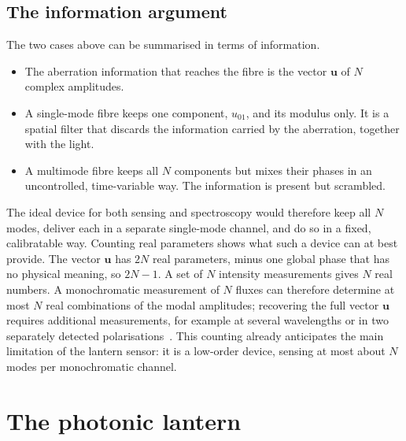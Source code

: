 \documentclass[11pt,a4paper]{article}
\newcommand{\uvec}{\mathbf{u}}
\begin{document}
\subsection{The information argument}
The two cases above can be summarised in terms of information.
\begin{itemize}
\item The aberration information that reaches the fibre is the vector $\uvec$ of $N$ complex amplitudes.
\item A single-mode fibre keeps one component, $u_{01}$, and its modulus only. It is a spatial filter that discards the information carried by the aberration, together with the light.
\item A multimode fibre keeps all $N$ components but mixes their phases in an uncontrolled, time-variable way. The information is present but scrambled.
\end{itemize}
The ideal device for both sensing and spectroscopy would therefore keep all $N$ modes, deliver each in a separate single-mode channel, and do so in a fixed, calibratable way. Counting real parameters shows what such a device can at best provide. The vector $\uvec$ has $2N$ real parameters, minus one global phase that has no physical meaning, so $2N - 1$. A set of $N$ intensity measurements gives $N$ real numbers. A monochromatic measurement of $N$ fluxes can therefore determine at most $N$ real combinations of the modal amplitudes; recovering the full vector $\uvec$ requires additional measurements, for example at several wavelengths or in two separately detected polarisations~\cite{Lin2023PRL}. This counting already anticipates the main limitation of the lantern sensor: it is a low-order device, sensing at most about $N$ modes per monochromatic channel.

\section{The photonic lantern}
\end{document}
